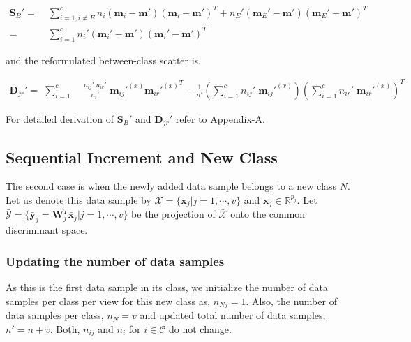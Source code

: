 \begin{equation}
\begin{split}
\label{eqn:1Sb}
\textbf{S}_B' = \; & \sum_{i=1,i\neq E}^{c} n_{i} (\textbf{m}_{i} - \textbf{m}') (\textbf{m}_{i} - \textbf{m}')^T + n_{E}'(\textbf{m}_E' - \textbf{m}') (\textbf{m}_E' - \textbf{m}')^T\\
= \; & \sum_{i=1}^{c} n_{i}' (\textbf{m}_{i}' - \textbf{m}') (\textbf{m}_{i}' - \textbf{m}')^T
\end{split}
\end{equation}

\noindent
and the reformulated between-class scatter is,

\begin{equation}
\label{eqn:1Djr}
\begin{split}
\textbf{D}_{jr}' = \; \sum_{i=1}^{c} & \; \frac{n_{ij}' \; n_{ir}'}{n_{i}'} \; {\textbf{m}_{ij}'}^{(x)} {{\textbf{m}_{ir}'}^{(x)}}^T - \frac{1}{n'} \left (\sum_{i=1}^{c} n_{ij}' \; {\textbf{m}_{ij}'}^{(x)} \right ) \left (\sum_{i=1}^{c} n_{ir}' \; {{\textbf{m}_{ir}'}^{(x)}} \right )^T
\end{split}
\end{equation}

\noindent
For detailed derivation of $\textbf{S}_B'$ and $\textbf{D}_{jr}'$ refer to Appendix-A.%












\subsection{Sequential Increment and New Class}
\label{subs:MvIDA_SeqNC}
The second case is when the newly added data sample belongs to a new class $N$. Let us denote this data sample by 
$\bar{\mathcal{X}} = \{ \bar{\textbf{x}}_{j} | j=1,\cdots,v \} $ and $\bar{\textbf{x}}_j \in \mathbb{R}^{p_j}$. Let $\bar{\mathcal{Y}} = \{ \bar{\textbf{y}}_{j} = \textbf{W}_j^T \bar{\textbf{x}}_{j} | j=1,\cdots,v \} $ be the projection of $\bar{\mathcal{X}}$ onto the common discriminant space.


\subsubsection{Updating the number of data samples}
\label{ssubs:MvIDA_SeqNC_n}
As this is the first data sample in its class, we initialize the number of data samples per class per view for this new class as, $n_{Nj} = 1$. Also, the number of data samples per class, $n_N = v$ and updated total number of data samples, $n' = n + v$. Both, $n_{ij}$ and $n_i$ for $i \in \mathcal{C}$ do not change.



